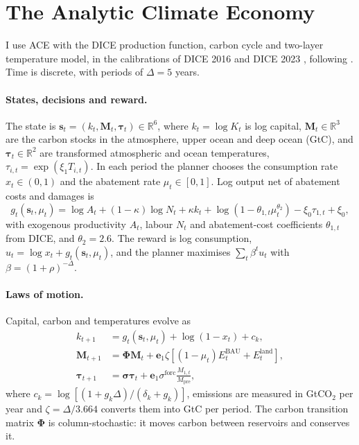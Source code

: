 \section{The Analytic Climate Economy}
\label{sec:model}

I use ACE \parencite{TraegerChristian2023ACE} with the DICE production function, carbon cycle and two-layer temperature model, in the calibrations of DICE 2016 \parencite{NordhausWilliam2018PaUa} and DICE 2023 \parencite{NordhausWilliam2023}, following \textcite{traeger2021analytic_discussion}. Time is discrete, with periods of $\Delta = 5$ years.

\paragraph{States, decisions and reward.} The state is $\bm{s}_t = (k_t, \bm{M}_t, \bm{\tau}_t) \in \mathbb{R}^6$, where $k_t = \log K_t$ is log capital, $\bm{M}_t \in \mathbb{R}^3$ are the carbon stocks in the atmosphere, upper ocean and deep ocean (GtC), and $\bm{\tau}_t \in \mathbb{R}^2$ are transformed atmospheric and ocean temperatures, $\tau_{i,t} = \exp(\xi_1 T_{i,t})$. In each period the planner chooses the consumption rate $x_t \in (0, 1)$ and the abatement rate $\mu_t \in [0, 1]$. Log output net of abatement costs and damages is
\begin{equation}
    g_t(\bm{s}_t, \mu_t) = \log A_t + (1-\kappa)\log N_t + \kappa k_t + \log\left(1 - \theta_{1,t}\mu_t^{\theta_2}\right) - \xi_0 \tau_{1,t} + \xi_0,
    \label{eq:g}
\end{equation}
with exogenous productivity $A_t$, labour $N_t$ and abatement-cost coefficients $\theta_{1,t}$ from DICE, and $\theta_2 = 2.6$. The reward is log consumption, $u_t = \log x_t + g_t(\bm{s}_t, \mu_t)$, and the planner maximises $\sum_t \beta^t u_t$ with $\beta = (1+\rho)^{-\Delta}$.

\paragraph{Laws of motion.} Capital, carbon and temperatures evolve as
\begin{align}
    k_{t+1} &= g_t(\bm{s}_t, \mu_t) + \log(1 - x_t) + c_k, \label{eq:k} \\
    \bm{M}_{t+1} &= \bm{\Phi}\bm{M}_t + \bm{e}_1 \zeta \left[(1-\mu_t)E^{\text{BAU}}_t + E^{\text{land}}_t\right], \label{eq:M} \\
    \bm{\tau}_{t+1} &= \bm{\sigma}\bm{\tau}_t + \bm{e}_1 \sigma^{\text{forc}} \frac{M_{1,t}}{M_{\text{pre}}}, \label{eq:tau}
\end{align}
where $c_k = \log[(1 + g_k\Delta)/(\delta_k + g_k)]$, emissions are measured in GtCO$_2$ per year and $\zeta = \Delta/3.664$ converts them into GtC per period. The carbon transition matrix $\bm{\Phi}$ is column-stochastic: it moves carbon between reservoirs and conserves it.

